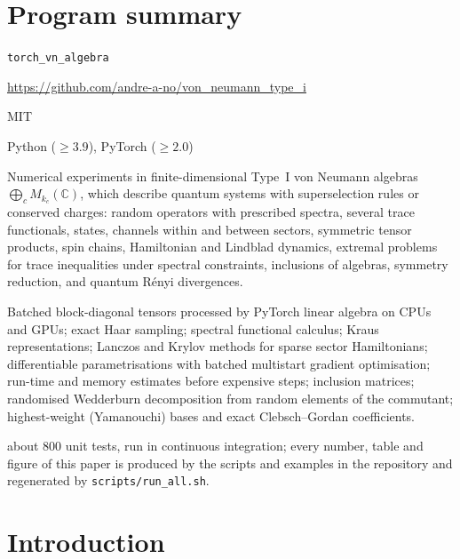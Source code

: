 \documentclass[11pt]{article}
\newcommand{\C}{\mathbb{C}}
\begin{document}
\section*{Program summary}
\begin{description}\itemsep0pt
\item[Program title:] \texttt{torch\_vn\_algebra}
\item[Developer's repository link:] \url{https://github.com/andre-a-no/von_neumann_type_i}
\item[Licensing provisions:] MIT
\item[Programming language:] Python ($\ge3.9$), PyTorch ($\ge2.0$)
\item[Nature of problem:] Numerical experiments in finite-dimensional Type~I von Neumann algebras
$\bigoplus_cM_{k_c}(\C)$, which describe quantum systems with superselection rules or conserved charges:
random operators with prescribed spectra, several trace functionals, states, channels within and between
sectors, symmetric tensor products, spin chains, Hamiltonian and Lindblad dynamics, extremal problems for
trace inequalities under spectral constraints, inclusions of algebras, symmetry reduction, and quantum Rényi
divergences.
\item[Solution method:] Batched block-diagonal tensors processed by PyTorch linear algebra on CPUs and GPUs;
exact Haar sampling; spectral functional calculus; Kraus representations; Lanczos and Krylov methods for
sparse sector Hamiltonians; differentiable parametrisations with batched multistart gradient optimisation;
run-time and memory estimates before expensive steps; inclusion matrices; randomised Wedderburn decomposition
from random elements of the commutant; highest-weight (Yamanouchi) bases and exact Clebsch--Gordan coefficients.
\item[Additional comments:] about 800 unit tests, run in continuous integration; every number, table and figure of
this paper is produced by the scripts and examples in the repository and regenerated by \texttt{scripts/run\_all.sh}.
\end{description}

\section{Introduction}\label{sec:intro}
\end{document}
